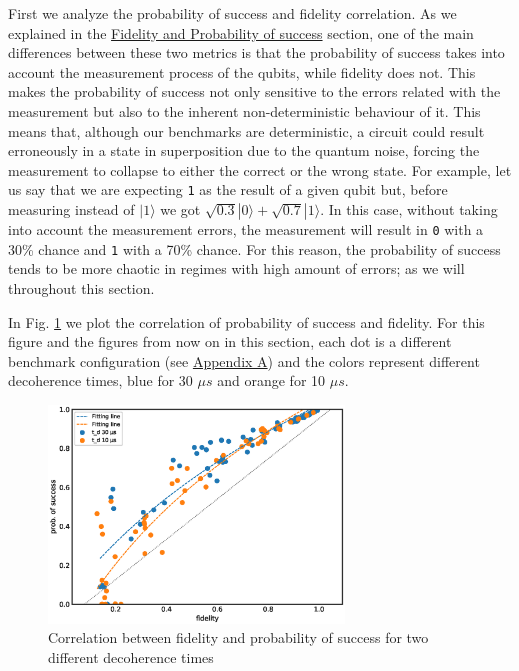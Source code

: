 First we analyze the probability of success and fidelity correlation.
As we explained in the \hyperref[sec:org0c7b2c2]{Fidelity and Probability of success} section, one of the main differences between these two metrics is that the probability of success takes into account the measurement process of the qubits, while fidelity does not.
This makes the probability of success not only sensitive to the errors related with the measurement but also to the inherent non-deterministic behaviour of it.
This means that, although our benchmarks are deterministic, a circuit could result erroneously in a state in superposition due to the quantum noise, forcing the measurement to collapse to either the correct or the wrong state.
For example, let us say that we are expecting \texttt{1} as the result of a given qubit but, before measuring instead of \(|1\rangle\) we got \(\sqrt{0.3} |0\rangle + \sqrt{0.7} |1\rangle\).
In this case, without taking into account the measurement errors, the measurement will result in \texttt{0} with a 30\% chance and \texttt{1} with a 70\% chance.
For this reason, the probability of success tends to be more chaotic in regimes with high amount of errors; as we will throughout this section.



In Fig. \ref{fig:f_ps_correlation_with_meas_error} we plot the correlation of probability of success and fidelity. 
For this figure and the figures from now on in this section, each dot is a different benchmark configuration (see \href{appendix-1.org}{Appendix A}) and the colors represent different decoherence times, blue for 30 \(\mu s\) and orange for 10 \(\mu s\).


\begin{figure}[htbp]
\centering
\includegraphics[width=0.7\textwidth]{figures/f_ps_correlation.eps}
\caption{\label{fig:f_ps_correlation_with_meas_error}
Correlation between fidelity and probability of success for two different decoherence times}
\end{figure}



